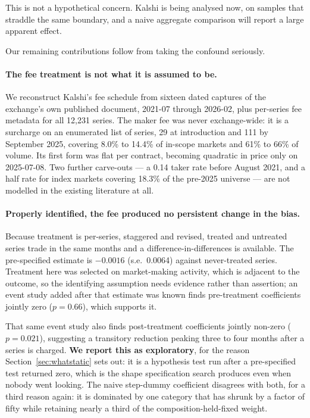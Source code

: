 \documentclass[preprint,12pt,authoryear]{elsarticle}
\begin{document}
This is not a hypothetical concern. Kalshi is being analysed now, on samples
that straddle the same boundary, and a naive aggregate comparison will report a
large apparent effect.

Our remaining contributions follow from taking the confound seriously.

\paragraph{The fee treatment is not what it is assumed to be.} We reconstruct
Kalshi's fee schedule from sixteen dated captures of the exchange's own
published document, 2021-07 through 2026-02, plus per-series fee metadata for
all 12,231 series. The maker fee was never exchange-wide: it is a surcharge on
an enumerated list of series, 29 at introduction and 111 by September 2025,
covering 8.0\% to 14.4\% of in-scope markets and 61\% to 66\% of volume. Its
first form was flat per contract, becoming quadratic in price only on
2025-07-08. Two further carve-outs --- a 0.14 taker rate before August 2021, and
a half rate for index markets covering 18.3\% of the pre-2025 universe --- are
not modelled in the existing literature at all.

\paragraph{Properly identified, the fee produced no persistent change in the
bias.} Because treatment is per-series, staggered and revised, treated and
untreated series trade in the same months and a difference-in-differences is
available. The pre-specified estimate is $-0.0016$ (s.e.\ 0.0064) against
never-treated series. Treatment here was selected on market-making activity,
which is adjacent to the outcome, so the identifying assumption needs evidence
rather than assertion; an event study added after that estimate was known finds
pre-treatment coefficients jointly zero ($p = 0.66$), which supports it.

That same event study also finds post-treatment coefficients jointly non-zero
($p = 0.021$), suggesting a transitory reduction peaking three to four months
after a series is charged. \textbf{We report this as exploratory}, for the
reason Section~\ref{sec:whatstatic} sets out: it is a hypothesis test run after
a pre-specified test returned zero, which is the shape specification search
produces even when nobody went looking. The naive step-dummy coefficient
disagrees with both, for a third reason again: it is dominated by one category
that has shrunk by a factor of fifty while retaining nearly a third of the
composition-held-fixed weight.
\end{document}
